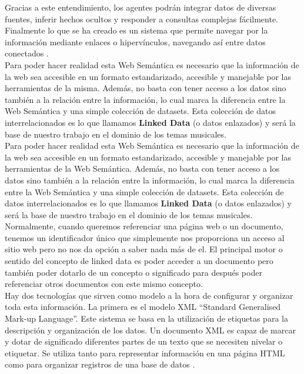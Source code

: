 Gracias a este entendimiento, los agentes podrán integrar datos de diversas fuentes, inferir hechos ocultos y responder a consultas complejas fácilmente. Finalmente lo que se ha creado es un sistema que permite navegar por la información mediante enlaces o hipervínculos, navegando así entre datos conectados \cite{sakr2018}.\\

Para poder hacer realidad esta Web Semántica es necesario que la información de la web sea accesible en un formato estandarizado, accesible y manejable por las herramientas de la misma. Además, no basta con tener acceso a los datos sino también a la relación entre la información, lo cual marca la diferencia entre la Web Semántica y una simple colección de datasets. Esta colección de datos interrelacionados es lo que llamamos \textbf{Linked Data} (o datos enlazados) y será la base de nuestro trabajo en el dominio de los temas musicales.\\


Para poder hacer realidad esta Web Semántica es necesario que la información de la web sea accesible en un formato estandarizado, accesible y manejable por las herramientas de la Web Semántica. Además, no basta con tener acceso a los datos sino también a la relación entre la información, lo cual marca la diferencia entre la Web Semántica y una simple colección de datasets. Esta colección de datos interrelacionados es lo que llamamos \textbf{Linked Data} (o datos enlazados) y será la base de nuestro trabajo en el dominio de los temas musicales. Normalmente, cuando queremos referenciar una página web o un documento, tenemos un identificador único que simplemente nos proporciona un acceso al sitio web pero no nos da opción a saber nada más de el. El principal motor o sentido del concepto de linked data es poder acceder a un documento pero también poder dotarlo de un concepto o significado para después poder referenciar otros documentos con este mismo concepto. \\

Hay dos tecnologías que sirven como modelo a la hora de configurar y organizar toda esta información. La primera es el modelo XML ``Standard Generalised Mark-up Language''. Este sistema se basa en la utilización de etiquetas para la descripción y organización de los datos. Un documento XML es capaz de marcar y dotar de significado diferentes partes de un texto que se necesiten nivelar o etiquetar. Se utiliza tanto para representar información en una página HTML como para organizar registros de una base de datos \cite{heath2011}. \\

